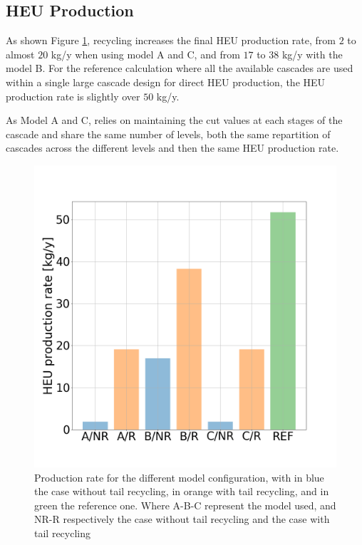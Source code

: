 \subsection{\gls{HEU} Production}

As shown Figure \ref{fig:HEU_rate}, recycling increases the final \gls{HEU}
production rate, from $2$ to almost $20$ kg/y when using model A and C, and from
$17$ to $38$ kg/y with the model B. For the reference calculation where all the
available cascades are used within a single large cascade design for direct
\gls{HEU} production, the \gls{HEU} production rate is slightly over $50$ kg/y.


As Model A and C, relies on maintaining the cut values at each stages of the
cascade and share the same number of levels, both the  same repartition of
cascades across the different levels and then the same \gls{HEU} production
rate.

\begin{figure}[h!] %
    \centering
    \includegraphics[scale=0.25]{HEU_prod_rate}
    \caption{Production rate for the different model configuration, with in blue
    the case without tail recycling, in orange with tail recycling, and in green
    the reference one. Where A-B-C represent the model used, and NR-R
    respectively the case without tail recycling and the case with tail recycling}
    \label{fig:HEU_rate}
\end{figure}
